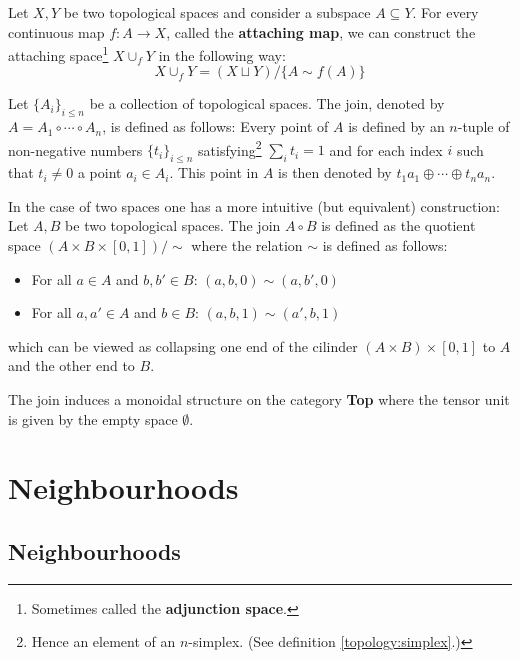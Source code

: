 	\begin{construct}\label{topology:attaching_space}
		Let $X, Y$ be two topological spaces and consider a subspace $A\subseteq Y$. For every continuous map $f:A\rightarrow X$, called the \textbf{attaching map}, we can construct the attaching space\footnote{Sometimes called the \textbf{adjunction space}.} $X\cup_f Y$ in the following way:
		\begin{equation}
			X\cup_f Y = (X\sqcup Y)/\{A\sim f(A)\}
		\end{equation}
	\end{construct}
	
	\begin{construct}[Join]
		Let $\{A_i\}_{i\leq n}$ be a collection of topological spaces. The join, denoted by $A=A_1\circ\cdots\circ A_n$, is defined as follows: Every point of $A$ is defined by an $n$-tuple of non-negative numbers $\{t_i\}_{i\leq n}$ satisfying\footnote{Hence an element of an $n$-simplex. (See definition \ref{topology:simplex}.)} $\sum_it_i=1$ and for each index $i$ such that $t_i\neq 0$ a point $a_i\in A_i$. This point in $A$ is then denoted by $t_1a_1\oplus\cdots\oplus t_na_n$.
		
		In the case of two spaces one has a more intuitive (but equivalent) construction: Let $A, B$ be two topological spaces. The join $A\circ B$ is defined as the quotient space $(A\times B\times [0, 1])/\sim$ where the relation $\sim$ is defined as follows:
		\begin{itemize}
			\item For all $a\in A$ and $b, b'\in B$: $(a, b, 0)\sim(a, b', 0)$
			\item For all $a, a'\in A$ and $b\in B$: $(a, b, 1)\sim(a', b, 1)$
		\end{itemize}
		which can be viewed as collapsing one end of the cilinder $(A\times B)\times[0, 1]$ to $A$ and the other end to $B$.
	\end{construct}
	\begin{property}
		The join induces a monoidal structure on the category \textbf{Top} where the tensor unit is given by the empty space $\emptyset$.
	\end{property}
    
\section{Neighbourhoods}
\subsection{Neighbourhoods}

